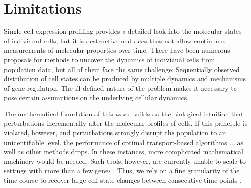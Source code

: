 

\section*{Limitations}

Single-cell expression profiling provides a detailed look into the molecular states of individual cells, but it is destructive and does thus not allow continuous measurements of molecular properties over time. There have been numerous proposals for methods to uncover the dynamics of individual cells from population data, but all of them face the same challenge: Sequentially observed distribution of cell states can be produced by multiple dynamics and mechanisms of gene regulation. The ill-defined nature of the problem makes it necessary to pose certain assumptions on the underlying cellular dynamics.

The mathematical foundation of this work builds on the biological intuition that perturbations incrementally alter the molecular profiles of cells. 
If this principle is violated, however, and perturbations strongly disrupt the population to an unidentifiable level, the performance of optimal transport-based algorithms ... as well as other methods drops.
In these instances, more complicated mathematical machinery would be needed.
Such tools, however, are currently unable to scale to settings with more than a few genes \citep{heydari2022iqcell}.
Thus, we rely on a fine granularity of the time course to recover large cell state changes between consecutive time points \citep{tritschler2019concepts}.

